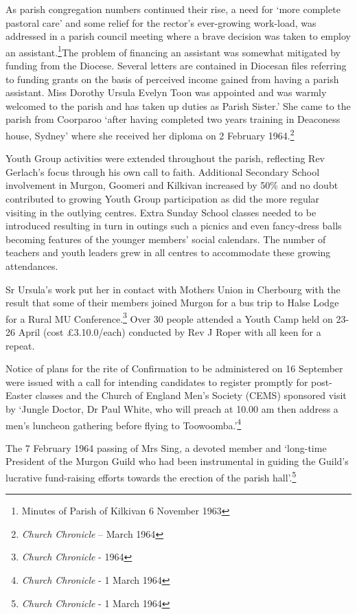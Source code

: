 As parish congregation numbers continued their rise, a need for `more complete pastoral care' and some relief for the rector's ever-growing work-load, was addressed in a parish council meeting where a brave decision was taken to employ an assistant.\footnote{Minutes of Parish of Kilkivan 6 November 1963}The problem of financing an assistant was somewhat mitigated by funding from the Diocese. Several letters are contained in Diocesan files referring to funding grants on the basis of perceived income gained from having a parish assistant. Miss Dorothy Ursula Evelyn Toon was appointed and was warmly welcomed to the parish and has taken up duties as Parish Sister.' She came to the parish from Coorparoo `after having completed two years training in Deaconess house, Sydney' where she received her diploma on 2 February 1964.\footnote{\emph{Church Chronicle} -- March 1964}

Youth Group activities were extended throughout the parish, reflecting Rev Gerlach's focus through his own call to faith. Additional Secondary School involvement in Murgon, Goomeri and Kilkivan increased by 50\% and no doubt contributed to growing Youth Group participation as did the more regular visiting in the outlying centres. Extra Sunday School classes needed to be introduced resulting in turn in outings such a picnics and even fancy-dress balls becoming features of the younger members' social calendars. The number of teachers and youth leaders grew in all centres to accommodate these growing attendances.

Sr Ursula's work put her in contact with Mothers Union in Cherbourg with the result that some of their members joined Murgon for a bus trip to Halse Lodge for a Rural MU Conference.\footnote{\emph{Church Chronicle} - 1964} Over 30 people attended a Youth Camp held on 23-26 April (cost £3.10.0/each) conducted by Rev J Roper with all keen for a repeat.

Notice of plans for the rite of Confirmation to be administered on 16 September were issued with a call for intending candidates to register promptly for post-Easter classes and the Church of England Men's Society (CEMS) sponsored visit by `Jungle Doctor, Dr Paul White, who will preach at 10.00 am then address a men's luncheon gathering before flying to Toowoomba.'\footnote{\emph{Church Chronicle} - 1 March 1964}

The 7 February 1964 passing of Mrs Sing, a devoted member and `long-time President of the Murgon Guild who had been instrumental in guiding the Guild's lucrative fund-raising efforts towards the erection of the parish hall'.\footnote{\emph{Church Chronicle} - 1 March 1964}

